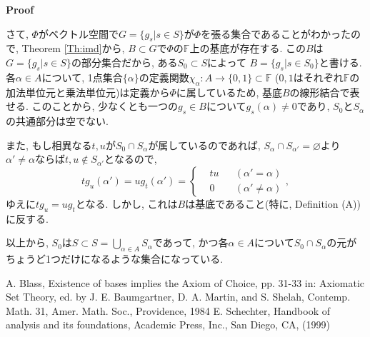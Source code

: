 \documentclass[a4paper]{ujarticle}
\makeatletter
\numberwithin{equation}{section}
\theoremstyle{definition}
\renewenvironment{proof}[1][Proof]{\par
  \pushQED{\qed}%
  \normalfont \topsep6\p@\@plus6\p@\relax
  \trivlist
  \item\relax
  {\bfseries
  #1\@addpunct{.}}\hspace\labelsep\ignorespaces
}{%
  \popQED\endtrivlist\@endpefalse
}
\makeatother
\begin{document}
\begin{proof}
\begin{itemize}
            さて, $\Phi$がベクトル空間で$G = \{g_s | s \in S \}$が$\Phi$を張る集合であることがわかったので,
            Theorem \ref{Th:imd}から, $B \subset G$で$\Phi$の$\mathbb{F}$上の基底が存在する.
            この$B$は$G = \{g_s | s \in S \}$の部分集合だから, ある$S_0 \subset S$によって
            $B = \{g_s | s \in S_0 \}$と書ける.
            各$\alpha \in A$について, 1点集合$\{\alpha\}$の定義関数$\chi_{\alpha}: A \rightarrow \{0, 1\} \subset \mathbb{F}$
            ($0, 1$はそれぞれ$\mathbb{F}$の加法単位元と乗法単位元)は定義から$\Phi$に属しているため, 
            基底$B$の線形結合で表せる. このことから, 少なくとも一つの$g_s \in B$について$g_s(\alpha) \neq 0$であり,
            $S_0$と$S_{\alpha}$の共通部分は空でない.

            また, もし相異なる$t, u$が$S_0 \cap S_{\alpha}$が属しているのであれば, 
            $S_{\alpha} \cap S_{\alpha'} = \varnothing$より$\alpha' \neq \alpha$ならば$t, u \notin S_{\alpha'}$となるので,
            \[
                t g_u(\alpha') = u g_t(\alpha') = 
                \left\{
                    \begin{aligned}
                        &tu &&(\alpha' = \alpha) \\
                        &0 &&(\alpha' \neq \alpha)
                    \end{aligned}
                \right.,
            \]
            ゆえに$t g_u = u g_t$となる. しかし, これは$B$は基底であること(特に, Definition (A))に反する. 
            
            以上から, $S_0$は$S \subset S = \bigcup_{\alpha \in A} S_{\alpha}$であって, 
            かつ各$\alpha \in A$について$S_0 \cap S_{\alpha}$の元がちょうど1つだけになるような集合になっている.
            \end{itemize}
    \end{proof}
    \begin{thebibliography}{10}
    \nocite{*}
     A. Blass, Existence of bases implies the Axiom of Choice, pp. 31-33 in: Axiomatic Set
	Theory, ed. by J. E. Baumgartner, D. A. Martin, and S. Shelah, Contemp. Math. 31,
	Amer. Math. Soc., Providence, 1984
	 E. Schechter, Handbook of analysis and its foundations, Academic Press, Inc., San Diego, CA, (1999)
\end{thebibliography}
\end{document}
